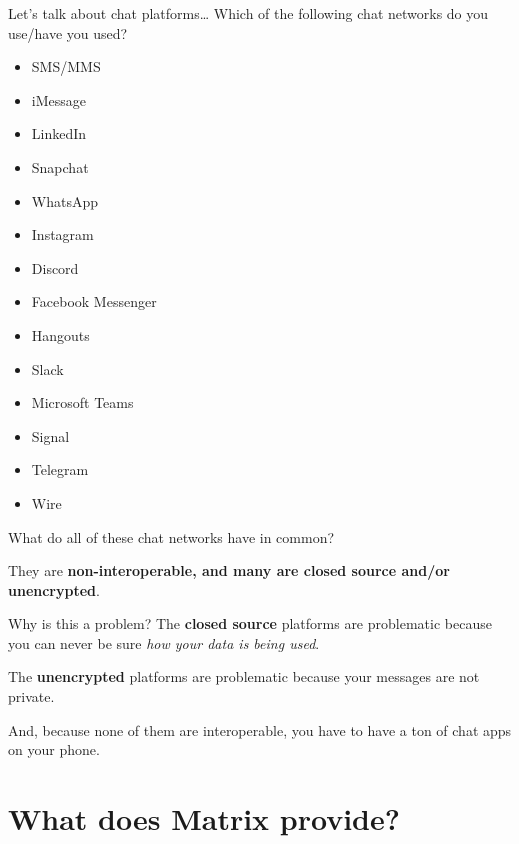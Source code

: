 \documentclass{acm}
\begin{document}
\begin{frame}{Let's talk about chat platforms\ldots}
    Which of the following chat networks do you use/have you used?
    \begin{multicols}{2}
        \begin{itemize}[<+->]
            \item SMS/MMS
            \item iMessage
            \item LinkedIn
            \item Snapchat
            \item WhatsApp
            \item Instagram
            \item Discord
            \item Facebook Messenger
            \item Hangouts
            \item Slack
            \item Microsoft Teams
            \item Signal
            \item Telegram
            \item Wire
        \end{itemize}
    \end{multicols}
    \pause[\thebeamerpauses]
    What do all of these chat networks have in common?
    \pause

    They are \textbf{non-interoperable, and many are closed source and/or
    unencrypted}.
\end{frame}

\begin{frame}{Why is this a problem?}
    The \textbf{closed source} platforms are problematic because you can never
    be sure \textit{how your data is being used}.
    \pause

    The \textbf{unencrypted} platforms are problematic because your messages are
    not private.
    \pause

    And, because none of them are interoperable, you have to have a ton of chat
    apps on your phone.
\end{frame}

\section{What does Matrix provide?}
\end{document}
